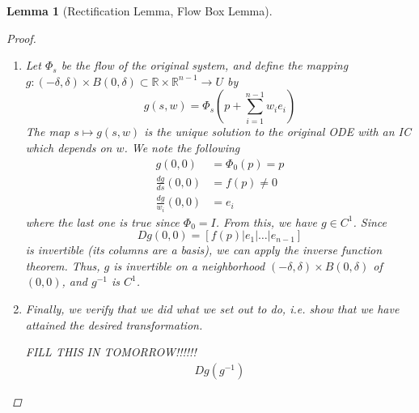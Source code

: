 \documentclass{article}
\newtheorem{lemma}[theorem]{Lemma}
\def\R{{\mathbb R}}
\begin{document}
\begin{lemma}[Rectification Lemma, Flow Box Lemma]
\begin{proof}
\begin{enumerate}
\item Let $\Phi_s$ be the flow of the original system, and define the mapping $g: (-\delta, \delta) \times B(0, \delta) \subset \R \times \R^{n-1} \rightarrow U$ by
\[
g(s, w) = \Phi_s\left( p + \sum_{i=1}^{n-1} w_i e_i \right)
\]
The map $s \mapsto g(s, w)$ is the unique solution to the original ODE with an IC which depends on $w$. We note the following
\begin{align*}
g(0, 0) &= \Phi_0(p) = p \\
\frac{dg}{ds}(0, 0) &= f(p) \neq 0 \\
\frac{dg}{w_i}(0, 0) &= e_i
\end{align*}
where the last one is true since $\Phi_0 = I$. From this, we have $g \in C^1$. Since
\[
Dg(0, 0) = [ f(p) | e_1 | \dots | e_{n-1}]
\]
is invertible (its columns are a basis), we can apply the inverse function theorem. Thus, $g$ is invertible on a neighborhood $(-\delta, \delta) \times B(0, \delta)$ of $(0, 0)$, and $g^{-1}$ is $C^1$.
\item Finally, we verify that we did what we set out to do, i.e. show that we have attained the desired transformation.

FILL THIS IN TOMORROW!!!!!!
\begin{align*}
Dg(g^{-1})
\end{align*}

\end{enumerate}
\end{proof}
\end{lemma}

\end{document}
